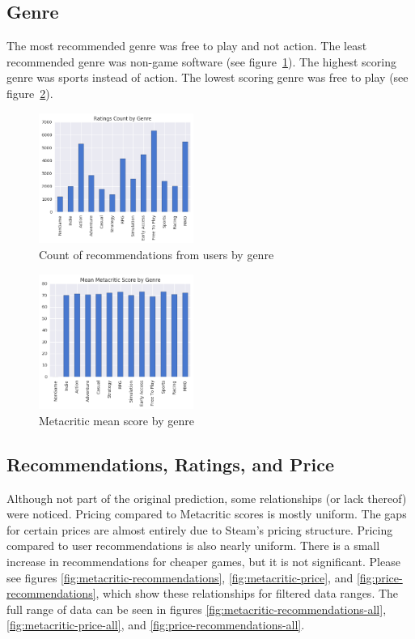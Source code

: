 \documentclass[letterpaper,10pt,twocolumn]{article}
\begin{document}
\subsection{Genre}

The most recommended genre was free to play and not action. The least
recommended genre was non-game software (see figure~\ref{fig:genre-ratings}).
The highest scoring genre was sports instead of action. The lowest
scoring genre was free to play (see figure~\ref{fig:genre-metacritic}).

\begin{figure}[h]
    \caption{Count of recommendations from users by genre \label{fig:genre-ratings}}
    \includegraphics[width=0.45\textwidth,keepaspectratio]{genre-ratings-bar}
\end{figure}

\begin{figure}[h]
    \caption{Metacritic mean score by genre \label{fig:genre-metacritic}}
    \includegraphics[width=0.45\textwidth,keepaspectratio]{genre-metacritic-bar}
\end{figure}

\subsection{Recommendations, Ratings, and Price}

Although not part of the original prediction, some relationships (or lack
thereof) were noticed. Pricing compared to Metacritic scores is mostly
uniform. The gaps for certain prices are almost entirely due to Steam's
pricing structure. Pricing compared to user recommendations is also nearly
uniform. There is a small increase in recommendations for cheaper games, but
it is not significant. Please see figures
\ref{fig:metacritic-recommendations},
\ref{fig:metacritic-price}, and
\ref{fig:price-recommendations}, which show these relationships for filtered
data ranges. The full range of data can be seen in figures
\ref{fig:metacritic-recommendations-all},
\ref{fig:metacritic-price-all}, and
\ref{fig:price-recommendations-all}.
\end{document}
